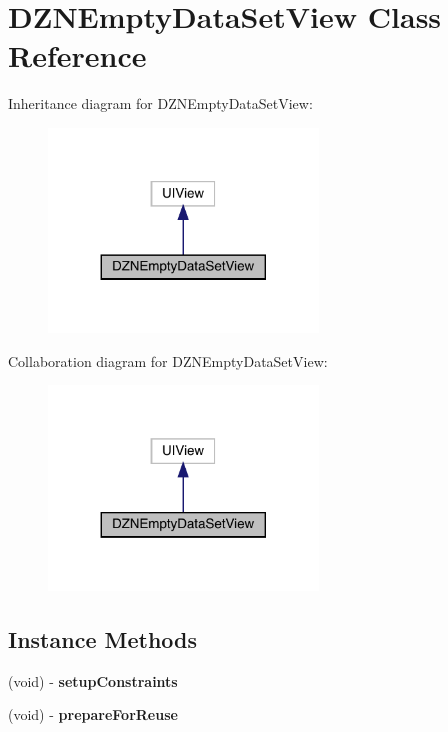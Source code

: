 \hypertarget{interface_d_z_n_empty_data_set_view}{}\section{D\+Z\+N\+Empty\+Data\+Set\+View Class Reference}
\label{interface_d_z_n_empty_data_set_view}


Inheritance diagram for D\+Z\+N\+Empty\+Data\+Set\+View\+:\nopagebreak
\begin{figure}[H]
\begin{center}
\leavevmode
\includegraphics[width=203pt]{interface_d_z_n_empty_data_set_view__inherit__graph}
\end{center}
\end{figure}


Collaboration diagram for D\+Z\+N\+Empty\+Data\+Set\+View\+:\nopagebreak
\begin{figure}[H]
\begin{center}
\leavevmode
\includegraphics[width=203pt]{interface_d_z_n_empty_data_set_view__coll__graph}
\end{center}
\end{figure}
\subsection*{Instance Methods}
\begin{DoxyCompactItemize}
\item 
\mbox{\label{interface_d_z_n_empty_data_set_view_a63e2b499b9ce14896fbd284fca996817}} 
(void) -\/ {\bfseries setup\+Constraints}
\item 
\mbox{\label{interface_d_z_n_empty_data_set_view_a11016096972b462cf7965b3da632b0d4}} 
(void) -\/ {\bfseries prepare\+For\+Reuse}
\end{DoxyCompactItemize}
